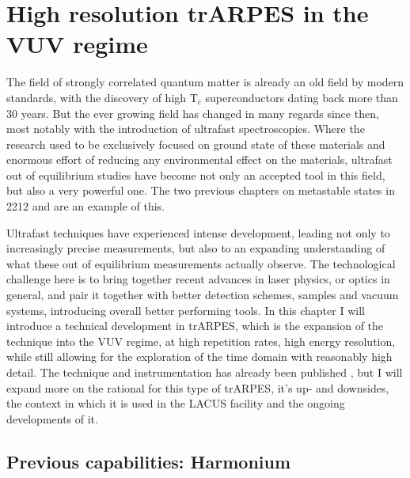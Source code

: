 \chapter{High resolution trARPES in the VUV regime}

The field of strongly correlated quantum matter is already an old field by modern standards, with the discovery of high T$_c$ superconductors dating back more than 30 years.
But the ever growing field has changed in many regards since then, most notably with the introduction of ultrafast spectroscopies.
Where the research used to be exclusively focused on ground state of these materials and enormous effort of reducing any environmental effect on the materials, ultrafast out of equilibrium studies have become not only an accepted tool in this field, but also a very powerful one.
The two previous chapters on metastable states in 2212 and  are an example of this.

Ultrafast techniques have experienced intense development, leading not only to increasingly precise measurements, but also to an expanding understanding of what these out of equilibrium measurements actually observe.
The technological challenge here is to bring together recent advances in laser physics, or optics in general, and pair it together with better detection schemes, samples and vacuum systems, introducing overall better performing tools.
In this chapter I will introduce a technical development in trARPES, which is the expansion of the technique into the VUV regime, at high repetition rates, high energy resolution, while still allowing for the exploration of the time domain with reasonably high detail.
The technique and instrumentation has already been published \cite{}, but I will expand more on the rational for this type of trARPES, it's up- and downsides, the context in which it is used in the LACUS facility and the ongoing developments of it.

\section{Previous capabilities: Harmonium}

